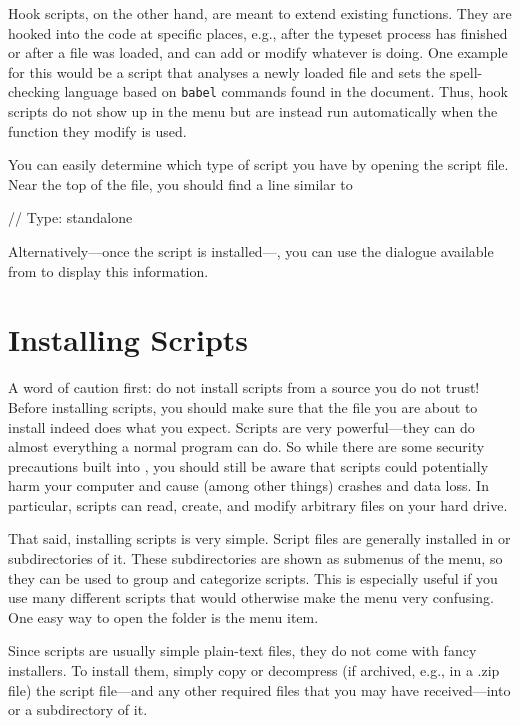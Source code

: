 Hook scripts, on the other hand, are meant to extend existing {\Tw} functions. They are hooked into the code at specific places, e.g., after the typeset process has finished or after a file was loaded, and can add or modify whatever {\Tw} is doing. One example for this would be a script that analyses a newly loaded file and sets the spell-checking language based on \verb+babel+ commands found in the document. Thus, hook scripts do not show up in the  menu but are instead run automatically when the {\Tw} function they modify is used.

You can easily determine which type of script you have by opening the script file. Near the top of the file, you should find a line similar to
\begin{verbExample}
// Type: standalone
\end{verbExample}
Alternatively---once the script is installed---, you can use the dialogue available from \submenu{}\submenu{} to display this information.

\section{Installing Scripts}
\label{sec:installing-scripts}

A word of caution first: do not install scripts from a source you do not trust! Before installing scripts, you should make sure that the file you are about to install indeed does what you expect. Scripts are very powerful---they can do almost everything a normal program can do. So while there are some security precautions built into {\Tw}, you should still be aware that scripts could potentially harm your computer and cause (among other things) crashes and data loss. In particular, scripts can read, create, and modify arbitrary files on your hard drive.

That said, installing scripts is very simple. Script files are generally installed in  or subdirectories of it. These subdirectories are shown as submenus of the  menu, so they can be used to group and categorize scripts. This is especially useful if you use many different scripts that would otherwise make the  menu very confusing. One easy way to open the  folder is the \submenu{}\submenu{} menu item.

Since scripts are usually simple plain-text files, they do not come with fancy installers. To install them, simply copy or decompress (if archived, e.g., in a .zip file) the script file---and any other required files that you may have received---into  or a subdirectory of it.


